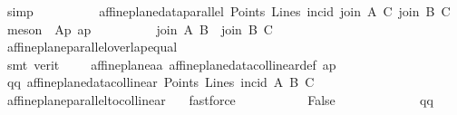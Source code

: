 \begin{isabellebody}
\ simp\isanewline
\ \ \ \ \ \ \ \ \isamarkupfalse%
\ {\isachardoublequoteopen}affine{\isacharunderscore}{\kern0pt}plane{\isacharunderscore}{\kern0pt}data{\isachardot}{\kern0pt}parallel\ Points\ Lines\ incid\ {\isacharparenleft}{\kern0pt}join\ A\ C{\isacharparenright}{\kern0pt}\ {\isacharparenleft}{\kern0pt}join\ B\ C{\isacharparenright}{\kern0pt}{\isachardoublequoteclose}\ \isamarkupfalse%
\ {\isacharparenleft}{\kern0pt}meson\ {\isachardoublequoteopen}{}{}{\isachardoublequoteclose}\ Ap{}{}\ ap{\isacharparenright}{\kern0pt}\isanewline
\ \ \ \ \ \ \ \ \isamarkupfalse%
\ {\isachardoublequoteopen}{\isacharparenleft}{\kern0pt}join\ A\ B{\isacharparenright}{\kern0pt}\ {\isacharequal}{\kern0pt}\ {\isacharparenleft}{\kern0pt}join\ B\ C{\isacharparenright}{\kern0pt}{\isachardoublequoteclose}\ \isamarkupfalse%
\ affine{\isacharunderscore}{\kern0pt}plane{\isachardot}{\kern0pt}parallel{\isacharunderscore}{\kern0pt}overlap{\isacharunderscore}{\kern0pt}equal\isanewline
\ \ \ \ \ \ \ \ \ \ \isamarkupfalse%
\ {\isacharparenleft}{\kern0pt}smt\ {\isacharparenleft}{\kern0pt}verit{\isacharparenright}{\kern0pt}\ {\isachardoublequoteopen}{}{\isachardoublequoteclose}\ {\isachardoublequoteopen}{}{\isachardoublequoteclose}\ {\isachardoublequoteopen}{}{\isachardoublequoteclose}\ {\isachardoublequoteopen}{}{\isachardoublequoteclose}\ affine{\isacharunderscore}{\kern0pt}plane{\isachardot}{\kern0pt}a{}a\ affine{\isacharunderscore}{\kern0pt}plane{\isacharunderscore}{\kern0pt}data{\isachardot}{\kern0pt}collinear{\isacharunderscore}{\kern0pt}def\ ap{\isacharparenright}{\kern0pt}\isanewline
\ \ \ \ \ \ \ \ \isamarkupfalse%
\ qq{\isacharcolon}{\kern0pt}\ {\isachardoublequoteopen}affine{\isacharunderscore}{\kern0pt}plane{\isacharunderscore}{\kern0pt}data{\isachardot}{\kern0pt}collinear\ Points\ Lines\ {\isacharparenleft}{\kern0pt}incid{\isacharparenright}{\kern0pt}\ A\ B\ C{\isachardoublequoteclose}\ \isamarkupfalse%
\ affine{\isacharunderscore}{\kern0pt}plane{\isachardot}{\kern0pt}parallel{\isacharunderscore}{\kern0pt}to{\isacharunderscore}{\kern0pt}collinear\ {}\ \isamarkupfalse%
\ fastforce\ \isanewline
\ \ \ \ \ \ \ \ \isamarkupfalse%
\ {\isachardoublequoteopen}False{\isachardoublequoteclose}\isanewline
\ \ \ \ \ \ \ \ \ \ \isamarkupfalse%
\ {\isachardoublequoteopen}{}{\isachardoublequoteclose}\ qq\ \isamarkupfalse%

\end{isabellebody}
